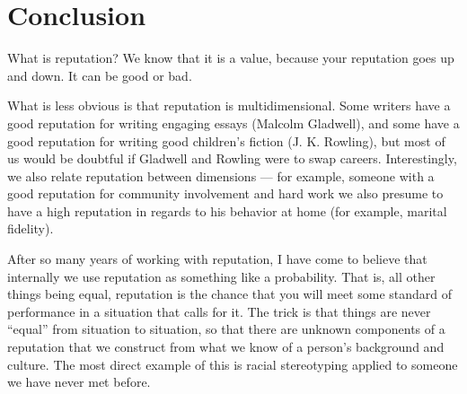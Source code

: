 \section{Conclusion}

\begin{comment}
Used to filter too much information, as in page rank.
But also used to encourage desirable behavior
(and discourage undesirable behavior).

Does a vandal to Wikipedia care that his reputation is
tarnished?  What kind of punishment is this?

Applications: peer review, text trust, sexual offender registry, job references.
Can we use reputation to figure out whether people
fit into a company culture?

What if web search rankings were done incrementally
instead of globally?  Would this give higher reputation
to \textit{fresh} parts of the web, and gracefully
phase out crufty parts?  Crucial to this would be the
need to update reputation based on page views, or
people following links from Facebook/Google, so that
we know that a static page is still actually relevant.
\end{comment}

What is reputation?  We know that it is a value, because your reputation goes
up and down. It can be good or bad.

What is less obvious is that reputation is multidimensional.  Some writers have
a good reputation for writing engaging essays (\eg Malcolm Gladwell), and some
have a good reputation for writing good children's fiction (\eg J. K. Rowling),
but most of us would be doubtful if Gladwell and Rowling were to swap careers.
Interestingly, we also relate reputation between
dimensions --- for example, someone
with a good reputation for community involvement and hard work we also presume
to have a high reputation in regards to his behavior at home (for example,
marital fidelity).

After so many years of working with reputation, I have come to believe that
internally we use reputation as something like a probability. That is, all
other things being equal, reputation is the chance that you will meet some
standard of performance in a situation that calls for it.  The trick is that
things are never ``equal'' from situation to situation, so that there are
unknown components of a reputation that we construct from what
we know of a person's background and culture.
The most direct example of this is racial stereotyping applied to
someone we have never met before.

